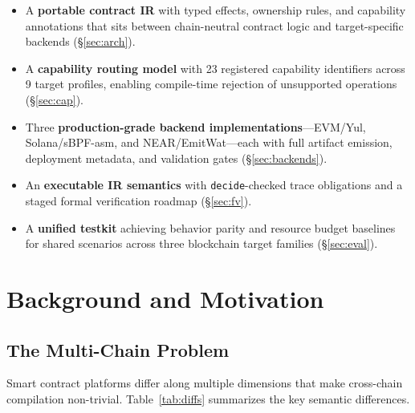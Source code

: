 \documentclass[sigconf]{acmart}
\begin{document}
\begin{itemize}[leftmargin=*]
  \item A \textbf{portable contract IR} with typed effects, ownership rules, and capability
  annotations that sits between chain-neutral contract logic and target-specific backends
  (\S\ref{sec:arch}).
  \item A \textbf{capability routing model} with 23 registered capability identifiers across 9
  target profiles, enabling compile-time rejection of unsupported operations (\S\ref{sec:cap}).
  \item Three \textbf{production-grade backend implementations}---EVM/Yul, Solana/sBPF-asm, and
  NEAR/EmitWat---each with full artifact emission, deployment metadata, and validation gates
  (\S\ref{sec:backends}).
  \item An \textbf{executable IR semantics} with \texttt{decide}-checked trace obligations and a
  staged formal verification roadmap (\S\ref{sec:fv}).
  \item A \textbf{unified testkit} achieving behavior parity and resource budget baselines for
  shared scenarios across three blockchain target families (\S\ref{sec:eval}).
\end{itemize}

\section{Background and Motivation}
\label{sec:bg}

\subsection{The Multi-Chain Problem}

Smart contract platforms differ along multiple dimensions that make cross-chain compilation
non-trivial. Table~\ref{tab:diffs} summarizes the key semantic differences.
\end{document}

